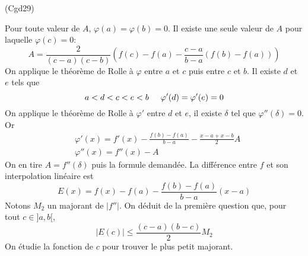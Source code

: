 \begin{tiny}(Cgd29)\end{tiny} Pour toute valeur de $A$, $\varphi(a)=\varphi(b)=0$. Il existe une seule valeur de $A$ pour laquelle $\varphi(c)=0$:
\begin{displaymath}
  A= \frac{2}{(c-a)(c-b)}\left(f(c)-f(a)-\frac{c-a}{b-a}(f(b)-f(a)) \right) 
\end{displaymath}
On applique le théorème de Rolle à $\varphi$ entre $a$ et $c$ puis entre $c$ et $b$. Il existe $d$ et $e$ tels que 
\begin{displaymath}
  a< d < c < e < b \hspace{0.5cm} \varphi'(d)=\varphi'(e)=0
\end{displaymath}
On applique le théorème de Rolle à $\varphi'$ entre $d$ et $e$, il existe $\delta$ tel que $\varphi''(\delta)=0$. Or
\begin{align*}
&\varphi'(x) = f'(x)-\frac{f(b)-f(a)}{b-a}-\frac{x-a +x-b}{2}A \\
&\varphi''(x) = f''(x) -A  
\end{align*}
On en tire $A=f''(\delta)$ puis la formule demandée.\newline
La différence entre $f$ et son interpolation linéaire est
\begin{displaymath}
  E(x) = f(x) - f(a) -\frac{f(b)-f(a)}{b-a}(x-a)
\end{displaymath}
Notons $M_2$ un majorant de $|f''|$. On déduit de la première question que, pour tout $c\in ]a,b[$,
\begin{displaymath}
  |E(c)|\leq \frac{(c-a)(b-c)}{2}M_2
\end{displaymath}
On étudie la fonction de $c$ pour trouver le plus petit majorant.